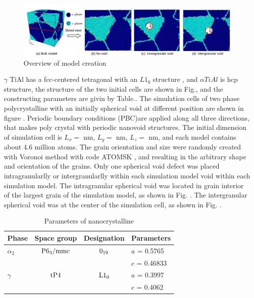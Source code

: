 \documentclass[journal,article,submit,moreauthors,pdftex,10pt,a4paper]{Definitions/mdpi}
\begin{document}
\begin{figure}[ht]
	\centering
	\includegraphics[width=1\linewidth]{img/models}
	\caption{Overview of model creation}
	\label{fig:model-creation}
\end{figure}

\cite{}
$\gamma $ TiAl has a fcc-centered tetragonal with an $L1_0$ structure \cite{}, and $\alpha TiAl$ is hcp structure, the structure of the two initial cells are shown in Fig.\cite{}, and the constructing parameters are givin by Table.\cite{}. The simulation cells of two phase polycrystalline with an initially spherical void at different position are shown in figure \cite{}. Periodic boundary conditions (PBC)are applied along all three directions, that makes poly crystal with periodic nanovoid structures. The initial dimension of simulation cell is  $L_x = $ nm, $L_y = $ nm, $L_z = $ nm, and each model contains about 4.6 million atoms. The grain orientation and size were randomly created with Voronoi method with code ATOMSK \cite{}, and resulting in the arbitrary shape and orientation of the grains. Only one spherical void defect was placed intragranularlly or intergranularlly within each simulation model void within each simulation model. The intragranular spherical void was located in grain interior of the largest grain of the simulation model, as shown in Fig. \cite{}. The intergranular spherical void was at the center of the simulation cell, as shown in Fig. \cite{}.
	
\begin{table}[ht]
	\caption{Parameters of  nanocrystalline}
	\centering
	\begin{tabular}{l c c l}
	\toprule
	\textbf{Phase}			& \textbf{Space group}		& \textbf{Designation} 		& \textbf{Parameters} \\
	\midrule
		$\alpha_2$		& $\rm P6_3/mmc$ 	& $\rm 0_{19}$ 		& $a$ = 0.5765 \\
		&					&					& $c$ = 0.46833 \\
		$\gamma$		& $\rm tP4$ 		& $\rm L1_0$		& $a$ = 0.3997 \\
		&					&					& $c$ = 0.4062 \\			
	\bottomrule
	\end{tabular} 
	\label{tab:lattice_parameter}
\end{table} 
	
\end{document}
